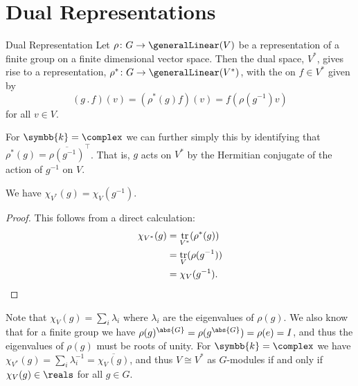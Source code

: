 \documentclass[fleqn]{NotesClass}
\renewcommand{\field}{\symbb{k}}
\newcommand{\action}{\mathbin{.}}
\newcommand{\isomorphic}{\cong}
\newcommand{\trans}{\top}
\DeclareMathOperator{\tr}{tr}
\begin{document}
    \section{Dual Representations}
    \begin{dfn}{Dual Representation}{}
        Let \(\rho \colon G \to \generalLinear(V)\) be a representation of a finite group on a finite dimensional vector space.
        Then the dual space, \(V^*\), gives rise to a representation, \(\rho^* \colon G \to \generalLinear(V^*)\), with the on \(f \in V^*\) given by
        \begin{equation}
            (g \action f)(v) = (\rho^*(g)f)(v) = f(\rho(g^{-1})v)
        \end{equation}
        for all \(v \in V\).
    \end{dfn}
    
    For \(\field = \complex\) we can further simply this by identifying that \(\rho^*(g) = \overline{\rho(g^{-1})}^{\trans}\).
    That is, \(g\) acts on \(V^*\) by the Hermitian conjugate of the action of \(g^{-1}\) on \(V\).
    
    \begin{lma}{}{}
        We have \(\chi_{V^*}(g) = \chi_{V}(g^{-1})\).
        \begin{proof}
            This follows from a direct calculation:
            \begin{align}
                \chi_{V^*}(g) &= \tr_{V^*}(\rho^*(g))\\
                &= \tr_{V}(\rho(g^{-1}))\\
                &= \chi_V(g^{-1}). \notag\qedhere
            \end{align}
        \end{proof}
    \end{lma}
    
    Note that \(\chi_V(g) = \sum_{i} \lambda_i\) where \(\lambda_i\) are the eigenvalues of \(\rho(g)\).
    We also know that for a finite group we have \(\rho(g)^{\abs{G}} = \rho(g^{\abs{G}}) = \rho(e) = I\), and thus the eigenvalues of \(\rho(g)\) must be roots of unity.
    For \(\field = \complex\) we have \(\chi_{V^*}(g) = \sum_{i} \lambda_i^{-1} = \overline{\chi_V(g)}\), and thus \(V \isomorphic V^*\) as \(G\)-modules if and only if \(\chi_V(g) \in \reals\) for all \(g \in G\).
    
\end{document}
